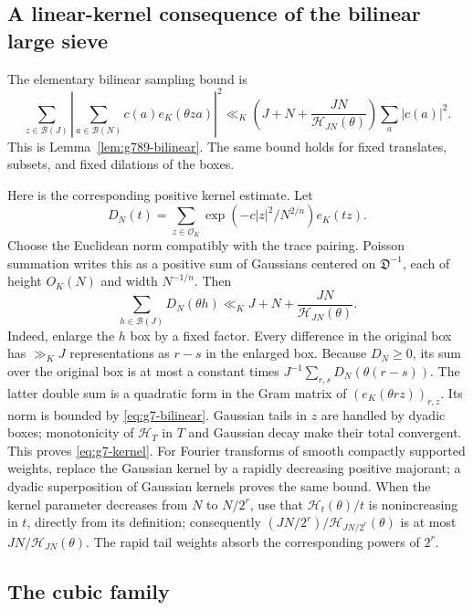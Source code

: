 \documentclass[11pt]{amsart}
\theoremstyle{definition}
\numberwithin{equation}{section}
\begin{document}
\subsection{A linear-kernel consequence of the bilinear large sieve}

The elementary bilinear sampling bound is
\begin{equation}\label{eq:g7-bilinear}
 \sum_{z\in\mathcal B(J)}\left|\sum_{a\in\mathcal B(N)}c(a)e_K(\theta za)\right|^2
 \ll_K\left(J+N+\frac{JN}{\mathcal H_{JN}(\theta)}\right)\sum_a|c(a)|^2.
\end{equation}
This is Lemma~\ref{lem:g789-bilinear}. The same bound holds for fixed translates, subsets, and fixed dilations of the boxes.

Here is the corresponding positive kernel estimate.  Let
\[
 D_N(t)=\sum_{z\in\mathcal O_K}
      \exp(-c|z|^2/N^{2/n})e_K(tz).
\]
Choose the Euclidean norm compatibly with the trace pairing.  Poisson
summation writes this as a positive sum of Gaussians centered on
$\mathfrak D^{-1}$, each of height $O_K(N)$ and width $N^{-1/n}$.
Then
\begin{equation}\label{eq:g7-kernel}
 \sum_{h\in\mathcal B(J)}D_N(\theta h)
 \ll_K J+N+\frac{JN}{\mathcal H_{JN}(\theta)}.
\end{equation}
Indeed, enlarge the $h$ box by a fixed factor.  Every difference in the
original box has $\gg_K J$ representations as $r-s$ in the enlarged box.
Because $D_N\ge0$, its sum over the original box is at most a constant times
$J^{-1}\sum_{r,s}D_N(\theta(r-s))$.  The latter double sum is a quadratic
form in the Gram matrix of $(e_K(\theta rz))_{r,z}$.  Its norm is bounded by
\eqref{eq:g7-bilinear}.  Gaussian tails in $z$ are handled by dyadic boxes;
monotonicity of $\mathcal H_T$ in $T$ and Gaussian decay make their total
convergent.  This proves \eqref{eq:g7-kernel}.
For Fourier transforms of smooth compactly supported weights, replace the
Gaussian kernel by a rapidly decreasing positive majorant; a dyadic
superposition of Gaussian kernels proves the same bound.  When the kernel
parameter decreases from $N$ to $N/2^r$, use that
$\mathcal H_t(\theta)/t$ is nonincreasing in $t$, directly from its
definition; consequently $(JN/2^r)/\mathcal H_{JN/2^r}(\theta)$
is at most $JN/\mathcal H_{JN}(\theta)$.  The rapid tail weights
absorb the corresponding powers of $2^r$.

\subsection{The cubic family}
\end{document}
